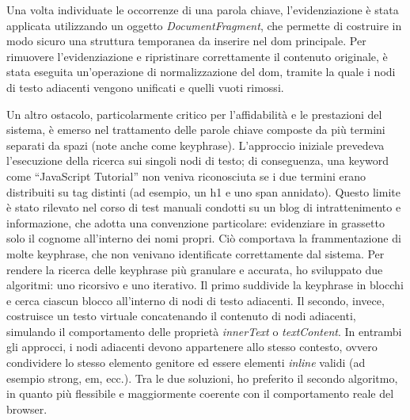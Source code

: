 \vspace{10pt}
\par\noindent Una volta individuate le occorrenze di una parola chiave, l’evidenziazione è stata applicata utilizzando un oggetto \textit{DocumentFragment}, che permette di costruire in modo sicuro una struttura temporanea da inserire nel \gls{dom} principale. Per rimuovere l’evidenziazione e ripristinare correttamente il contenuto originale, è stata eseguita un’operazione di normalizzazione del \gls{dom}, tramite la quale i nodi di testo adiacenti vengono unificati e quelli vuoti rimossi.

\vspace{10pt}
\par\noindent Un altro ostacolo, particolarmente critico per l’affidabilità e le prestazioni del sistema, è emerso nel trattamento delle parole chiave composte da più termini separati da spazi (note anche come keyphrase). L’approccio iniziale prevedeva l’esecuzione della ricerca sui singoli nodi di testo; di conseguenza, una keyword come “JavaScript Tutorial” non veniva riconosciuta se i due termini erano distribuiti su tag distinti (ad esempio, un h1 e uno span annidato). Questo limite è stato rilevato nel corso di test manuali condotti su un blog di intrattenimento e informazione, che adotta una convenzione particolare: evidenziare in grassetto solo il cognome all’interno dei nomi propri. Ciò comportava la frammentazione di molte keyphrase, che non venivano identificate correttamente dal sistema. Per rendere la ricerca delle keyphrase più granulare e accurata, ho sviluppato due algoritmi: uno ricorsivo e uno iterativo. Il primo suddivide la keyphrase in blocchi e cerca ciascun blocco all’interno di nodi di testo adiacenti. Il secondo, invece, costruisce un testo virtuale concatenando il contenuto di nodi adiacenti, simulando il comportamento delle proprietà \textit{innerText} o \textit{textContent}. In entrambi gli approcci, i nodi adiacenti devono appartenere allo stesso contesto, ovvero condividere lo stesso elemento genitore ed essere elementi \textit{inline} validi (ad esempio strong, em, ecc.). Tra le due soluzioni, ho preferito il secondo algoritmo, in quanto più flessibile e maggiormente coerente con il comportamento reale del browser.

